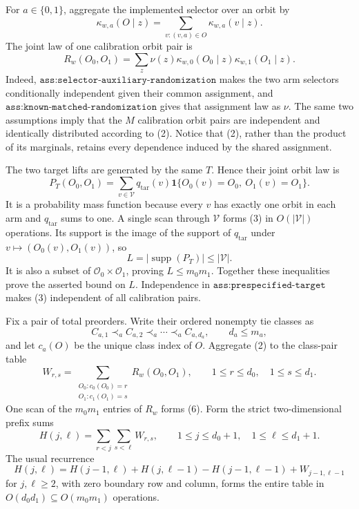 For \(a\in\{0,1\}\), aggregate the implemented selector over an orbit by
\[
\kappa_{w,a}(O\mid z)=\sum_{v:(v,a)\in O}\kappa_{w,a}(v\mid z).
\tag{1}
\]
The joint law of one calibration orbit pair is
\[
R_w(O_0,O_1)=\sum_z\nu(z)\kappa_{w,0}(O_0\mid z)\kappa_{w,1}(O_1\mid z).
\tag{2}
\]
Indeed, \(\texttt{ass:selector-auxiliary-randomization}\) makes the two arm selectors conditionally independent given their common assignment, and \(\texttt{ass:known-matched-randomization}\) gives that assignment law as \(\nu\). The same two assumptions imply that the \(M\) calibration orbit pairs are independent and identically distributed according to (2). Notice that (2), rather than the product of its marginals, retains every dependence induced by the shared assignment.

The two target lifts are generated by the same \(T\). Hence their joint orbit law is
\[
P_T(O_0,O_1)=\sum_{v\in\mathcal V}q_{\mathrm{tar}}(v)\mathbf 1\{O_0(v)=O_0,\ O_1(v)=O_1\}.
\tag{3}
\]
It is a probability mass function because every \(v\) has exactly one orbit in each arm and \(q_{\mathrm{tar}}\) sums to one. A single scan through \(\mathcal V\) forms (3) in \(O(|\mathcal V|)\) operations. Its support is the image of the support of \(q_{\mathrm{tar}}\) under \(v\mapsto(O_0(v),O_1(v))\), so
\[
L=|\operatorname{supp}(P_T)|\le|\mathcal V|.
\tag{4}
\]
It is also a subset of \(\mathcal O_0\times\mathcal O_1\), proving \(L\le m_0m_1\). Together these inequalities prove the asserted bound on \(L\). Independence in \(\texttt{ass:prespecified-target}\) makes (3) independent of all calibration pairs.

Fix a pair of total preorders. Write their ordered nonempty tie classes as
\[
C_{a,1}\prec_a C_{a,2}\prec_a\cdots\prec_a C_{a,d_a},\qquad d_a\le m_a,
\tag{5}
\]
and let \(c_a(O)\) be the unique class index of \(O\). Aggregate (2) to the class-pair table
\[
W_{r,s}=\sum_{\substack{O_0:c_0(O_0)=r\\O_1:c_1(O_1)=s}}R_w(O_0,O_1),\qquad 1\le r\le d_0,\quad1\le s\le d_1.
\tag{6}
\]
One scan of the \(m_0m_1\) entries of \(R_w\) forms (6). Form the strict two-dimensional prefix sums
\[
H(j,\ell)=\sum_{r<j}\sum_{s<\ell}W_{r,s},\qquad 1\le j\le d_0+1,\quad1\le\ell\le d_1+1.
\tag{7}
\]
The usual recurrence
\[
H(j,\ell)=H(j-1,\ell)+H(j,\ell-1)-H(j-1,\ell-1)+W_{j-1,\ell-1}
\tag{8}
\]
for \(j,\ell\ge2\), with zero boundary row and column, forms the entire table in \(O(d_0d_1)\subseteq O(m_0m_1)\) operations.

